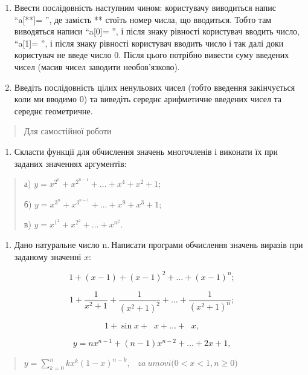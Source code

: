 \documentclass[]{article}
\begin{document}
\begin{enumerate}
\def\labelenumi{\arabic{enumi})}
\item
  Ввести послідовність наступним чином: користувачу виводиться напис
  ``a{[}**{]}= '', де замість ** стоїть номер числа, що вводиться. Тобто
  там виводяться написи ``a{[}0{]}= '', і після знаку рівності
  користувач вводить число, ``a{[}1{]}= '', і після знаку рівності
  користувач вводить число і так далі доки користувач не введе число 0.
  Після цього потрібно вивести суму введених чисел (масив чисел заводити
  необов'язково).
\item
  Введіть послідовність цілих ненульових чисел (тобто введення
  закінчується коли ми вводимо 0) та виведіть середнє арифметичне
  введених чисел та середнє геометричне.
\end{enumerate}

\begin{quote}
Для самостійної роботи
\end{quote}

\begin{enumerate}
\def\labelenumi{\arabic{enumi})}
\item
  Скласти функції для обчислення значень многочленів і виконати їх при
  заданих значеннях аргументів:
\end{enumerate}

\begin{quote}
а) \(y = x^{2^{n}} + x^{2^{n - 1}} + \ldots + x^{4} + x^{2} + 1;\)

б) \(y = x^{3^{n}} + x^{3^{n - 1}} + \ldots + x^{9} + x^{3} + 1;\)

в) \(y = x^{1^{2}} + x^{2^{2}} + \ldots + x^{n^{2}}.\)
\end{quote}

\begin{enumerate}
\def\labelenumi{\arabic{enumi})}
\item
  Дано натуральне число \(\text{n.}\ \)Написати програми обчислення
  значень виразів при заданому значенні \(x\):
\end{enumerate}

\[1 + (x - 1) + (x - 1)^{2} + \ldots + (x - 1)^{n};\]

\[1 + \frac{1}{x^{2} + 1} + \frac{1}{(x^{2} + 1)^{2}} + \ldots + \frac{1}{(x^{2} + 1)^{n}};\]

\[1 + \sin x + \operatorname{}x + \ldots + \operatorname{}x,\]

\[y = nx^{n - 1} + (n - 1)x^{n - 2} + \ldots + 2x + 1,\]

\begin{quote}
\(y = \sum_{k = 0}^{n}{kx^{k}(1 - x)^{n - k}},\mathrm{\ }\mathrm{\ }\)
\(za\ umovi\mathrm{(}0 < x < 1,n \geq 0)\)
\end{quote}
\end{document}
